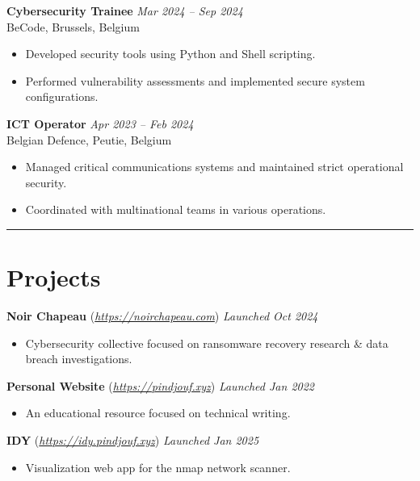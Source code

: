 \documentclass[a4paper,10pt]{article}
\begin{document}
\noindent\textbf{Cybersecurity Trainee} \hfill \textit{Mar 2024 – Sep 2024} \\
BeCode, Brussels, Belgium
\begin{itemize}
    \item Developed security tools using Python and Shell scripting.
    \item Performed vulnerability assessments and implemented secure system configurations.
\end{itemize}
\vspace{8pt}

\noindent\textbf{ICT Operator} \hfill \textit{Apr 2023 – Feb 2024} \\
Belgian Defence, Peutie, Belgium
\begin{itemize}
    \item Managed critical communications systems and maintained strict operational security.
    \item Coordinated with multinational teams in various operations.
\end{itemize}

\vspace{5pt}
\hrule

\section*{Projects}
\vspace{-4pt}
\textbf{Noir Chapeau} (\textit{\href{https://noirchapeau.com}{https://noirchapeau.com}}) \hfill \textit{Launched Oct 2024}
\begin{itemize}
    \item Cybersecurity collective focused on ransomware recovery research \& data breach investigations.
\end{itemize}

\noindent\textbf{Personal Website} (\textit{\href{https://pindjouf.xyz}{https://pindjouf.xyz}}) \hfill \textit{Launched Jan 2022}
\begin{itemize}
    \item An educational resource focused on technical writing.
\end{itemize}

\vspace{5pt}

\noindent\textbf{IDY} (\textit{\href{https://idy.pindjouf.xyz}{https://idy.pindjouf.xyz}}) \hfill \textit{Launched Jan 2025}
\begin{itemize}
    \item Visualization web app for the nmap network scanner.
\end{itemize}
\end{document}
